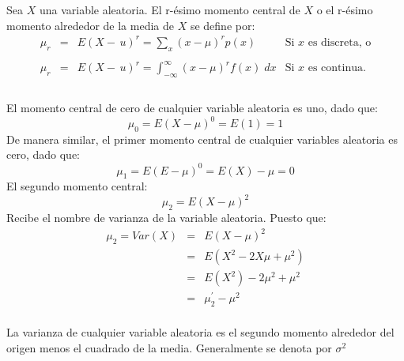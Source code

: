  \begin{tcolorbox}[colframe=white]
     \begin{def.}
	 Sea $X$ una variable aleatoria. El r-ésimo momento central de $X$ o el r-ésimo momento alrededor de la media de $X$ se define por:
	 $$\begin{array}{rcll}
	     \mu_r & = & E(X-\,u)^r = \sum_{x}(x-\mu)^r p(x) &  \mbox{Si $x$ es discreta, o}\\\\
	     \mu_r & = & E(X-\,u)^r = \displaystyle\int_{-\infty}^\infty (x-\mu)^r f(x)\; dx & \mbox{Si $x$ es continua.}\\\\
	 \end{array}$$
     \end{def.}
 \end{tcolorbox}

 El momento central de cero de cualquier variable aleatoria es uno, dado que:
 $$\mu_0 = E(X-\mu)^0 = E(1) = 1$$
 De manera similar, el primer momento central de cualquier variables aleatoria es cero, dado que:
 $$\mu_1 = E(E-\mu)^0 = E(X) - \mu = 0$$
 El segundo momento central:
 $$\mu_2 = E(X-\mu)^2$$
 Recibe el nombre de varianza de la variable aleatoria. Puesto que:
 $$\begin{array}{rcl}
     \mu_2 = Var(X) &=& E(X-\mu)^2\\
		    &=&E(X^2 - 2X\mu + \mu^2)\\
		    &=&E(X^2) - 2\mu^2 + \mu^2\\
		    &=&\mu_2^{'} - \mu^2\\
 \end{array}$$

 La varianza de cualquier variable aleatoria es el segundo momento alrededor del origen menos el cuadrado de la media. Generalmente se denota por $\sigma^2$

